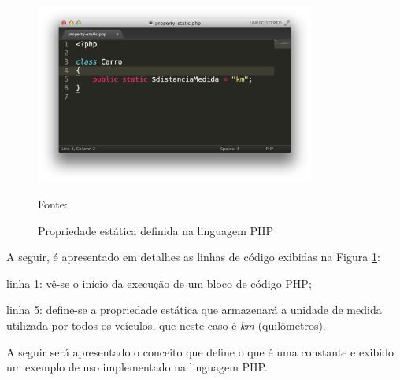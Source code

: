 \begin{figure}[h!tb]
	\caption{Propriedade estática definida na linguagem PHP}
	\label{fig:propriedadeEstatica}

	\centering
	\includegraphics[width=0.82\textwidth]{images/property-static.png}

	\centering
	\footnotesize Fonte: \fonteOAutor
\end{figure}

\FloatBarrier 	%

A seguir, é apresentado em detalhes as linhas de código exibidas na Figura
\ref{fig:propriedadeEstatica}:

\begin{alineas}
    \item linha 1: vê-se o início da execução de um bloco de código PHP;
    \item linha 5: define-se a propriedade estática que armazenará a unidade de
    medida utilizada por todos os veículos, que neste caso é \textit{km}
    (quilômetros).
\end{alineas}

A seguir será apresentado o conceito que define o que é uma constante e
exibido um exemplo de uso implementado na linguagem \acs{PHP}.
